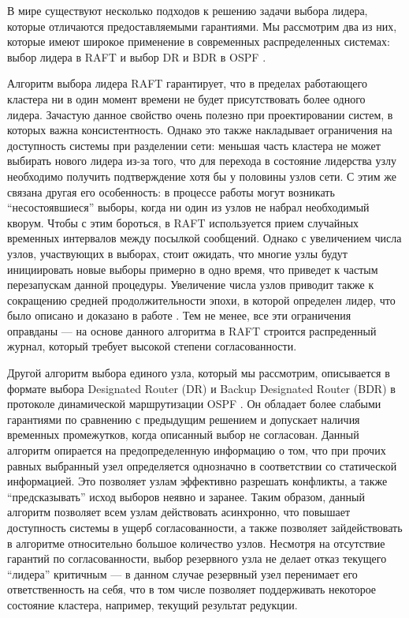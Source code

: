 \documentclass{article}
\theoremstyle{plain}
\theoremstyle{plain}
\theoremstyle{plain}
\theoremstyle{plain}
\theoremstyle{definition}
\theoremstyle{remark}
\theoremstyle{plain}
\begin{document}
В мире существуют несколько подходов к решению задачи выбора лидера, которые отличаются предоставляемыми гарантиями. Мы рассмотрим два из них, которые имеют широкое применение в современных распределенных системах: выбор лидера в RAFT \cite{RAFT} и выбор DR и BDR в OSPF  \cite[с.~75]{RFC2328}.

Алгоритм выбора лидера RAFT гарантирует, что в пределах работающего кластера ни в один момент времени не будет присутствовать более одного лидера. Зачастую данное свойство очень полезно при проектировании систем, в которых важна консистентность. Однако это также накладывает ограничения на доступность системы при разделении сети: меньшая часть кластера не может выбирать нового лидера из-за того, что для перехода в состояние лидерства узлу необходимо получить подтверждение хотя бы у половины узлов сети. С этим же связана другая его особенность: в процессе работы могут возникать \enquote{несостоявшиеся} выборы, когда ни один из узлов не набрал необходимый кворум. Чтобы с этим бороться, в RAFT используется прием случайных временных интервалов между посылкой сообщений. Однако с увеличением числа узлов, участвующих в выборах, стоит ожидать, что многие узлы будут инициировать новые выборы примерно в одно время, что приведет к частым перезапускам данной процедуры. Увеличение числа узлов приводит также к сокращению средней продолжительности эпохи, в которой определен лидер, что было описано и доказано в работе \cite{RAFT_performance_1808.01081}. Тем не менее, все эти ограничения оправданы --- на основе данного алгоритма в RAFT строится распреденный журнал, который требует высокой степени согласованности.

Другой алгоритм выбора единого узла, который мы рассмотрим, описывается в формате выбора Designated Router (DR) и Backup Designated Router (BDR) в протоколе динамической маршрутизации OSPF \cite[с.~75]{RFC2328}. Он обладает более слабыми гарантиями по сравнению с предыдущим решением и допускает наличия временных промежутков, когда описанный выбор не согласован. Данный алгоритм опирается на предопределенную информацию о том, что при прочих равных выбранный узел определяется однозначно в соответствии со статической информацией. Это позволяет узлам эффективно разрешать конфликты, а также \enquote{предсказывать} исход выборов неявно и заранее. Таким образом, данный алгоритм позволяет всем узлам действовать асинхронно, что повышает доступность системы в ущерб согласованности, а также позволяет зайдействовать в алгоритме относительно большое количество узлов. Несмотря на отсутствие гарантий по согласованности, выбор резервного узла не делает отказ текущего \enquote{лидера} критичным --- в данном случае резервный узел перенимает его ответственность на себя, что в том числе позволяет поддерживать некоторое состояние кластера, например, текущий результат редукции.
\end{document}
